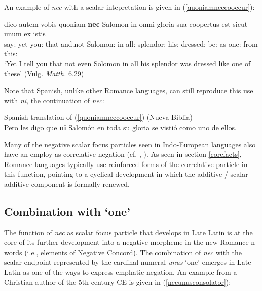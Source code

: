 \documentclass[output=paper,modfonts,nonflat,citecolor=brown,
showindex
]{langsci/langscibook}
\begin{document}
An example of {\em{nec}} with a scalar intepretation is given in (\ref{quoniamneccooccur}):

{\begin{exe}
\ex \label{quoniamneccooccur} \gll dico autem vobis quoniam {\bf{nec}} Salomon in omni gloria sua coopertus est sicut unum ex istis\\
say:{} yet you:{} that and.not Salomon:{} in all:{} splendor:{} his:{} dressed:{} be:{} as one:{} from this:{}\\

`Yet I tell you that not even Solomon in all his splendor was dressed like one of these' (Vulg. {\em{Matth.}} 6.29)
\end{exe}}

\noindent Note that Spanish, unlike other Romance languages, can still reproduce this use with {\em{ni}}, the continuation of {\em{nec}}:

{\begin{exe}
\ex Spanish translation of (\ref{quoniamneccooccur}) (Nueva Biblia)\\
Pero les digo que {\bf{ni}} Salom\'on en toda su gloria se visti\'o como uno de ellos.
\end{exe}}

\noindent Many of the negative scalar focus particles seen in Indo-European languages also have an employ as correlative negation (cf. \citealt[chapter 4]{Koenig91}, \citealt[]{Haspelmath07}). As seen in section \ref{corefacts}, Romance languages typically use reinforced forms of the correlative particle in this function, pointing to a cyclical development in which the additive / scalar additive component is formally renewed.

\subsection{Combination with `one'}

The function of {\em{nec}} as scalar focus particle that develops in Late Latin is at the core of its further development into a negative morpheme in the new Romance n-words (i.e., elements of Negative Concord). The combination of {\em{nec}} with the scalar endpoint represented by the cardinal numeral {\em{unus}} `one' emerges in Late Latin as one of the ways to express emphatic negation. An example from a Christian author of the 5th century CE is given in (\ref{necunusconsolator}):
\end{document}
